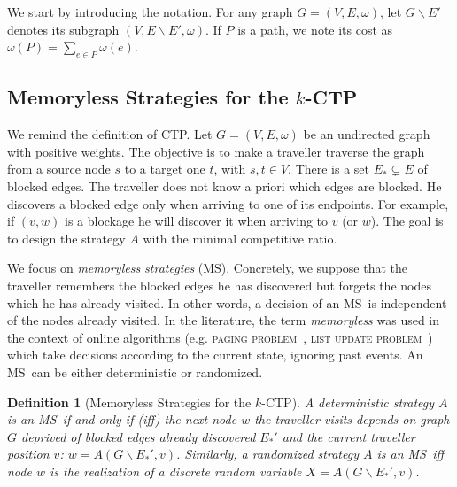 \documentclass[11pt,letterpaper]{article}
\newtheorem{definition}{Definition}
\newcommand{\kctp}{$k$-CTP}
\newcommand{\stpath}{$(s,t)$-path}
\newcommand{\mts}{MS}
\begin{document}
We start by introducing the notation. For any graph $G=\left(V,E,\omega\right)$, let $G\backslash E'$ denotes its subgraph $\left(V,E\backslash E',\omega\right)$. If $P$ is a path, we note its cost as $\omega\left(P\right) = \sum_{e \in P} \omega(e)$. 

\subsection{Memoryless Strategies for the \kctp} \label{subsec:msintro}

We remind the definition of CTP. Let $G=\left(V,E,\omega\right)$ be an undirected graph with positive weights. The objective is to make a traveller traverse the graph from a source node $s$ to a target one $t$, with $s,t \in V$. There is a set $E_* \subsetneq E$ of blocked edges. %
The traveller does not know a priori which edges are blocked. He discovers a blocked edge only when arriving to one of its endpoints. For example, if $\left(v,w\right)$ is a blockage he will discover it when arriving to $v$ (or $w$). The goal is to design the strategy $A$ with the minimal competitive ratio.

We focus on \textit{memoryless strategies} (\mts). Concretely, we suppose that the traveller remembers the blocked edges he has discovered but forgets the nodes which he has already visited. In other words, a decision of an \mts ~is independent of the nodes already visited. In the literature, the term \textit{memoryless} was used in the context of online algorithms (e.g. \textsc{paging problem}~\cite{BoEl98}, \textsc{list update problem}~\cite{Al03}) which take decisions according to the current state, ignoring past events. An \mts ~can be either deterministic or randomized.



\begin{definition}[Memoryless Strategies for the \kctp]
A deterministic strategy $A$ is an \mts ~if and only if (iff) the next node $w$ the traveller visits depends on graph $G$ deprived of blocked edges already discovered $E_*'$ and the current traveller position $v$: $w = A\left(G\backslash E_*',v\right)$. Similarly, a randomized strategy $A$ is an \mts ~iff node $w$ is the realization of a discrete random variable $X = A\left(G\backslash E_*',v\right)$.
\end{definition}
\end{document}
